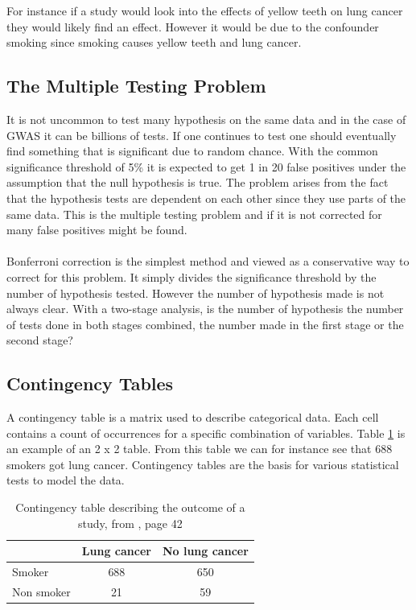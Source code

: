 \documentclass[10pt,a4paper]{report}
\newcounter{example}
\begin{document}
For instance if a study would look into the effects of yellow teeth on lung cancer they would likely find an effect. However it would be due to the confounder smoking since smoking causes yellow teeth and lung cancer. %

\subsection{The Multiple Testing Problem}
It is not uncommon to test many hypothesis on the same data and in the case of GWAS it can be billions of tests. If one continues to test one should eventually find something that is significant due to random chance. With the common significance threshold of 5\% it is expected to get 1 in 20 false positives under the assumption that the null hypothesis is true. The problem arises from the fact that the hypothesis tests are dependent on each other since they use parts of the same data. This is the multiple testing problem and if it is not corrected for many false positives might be found.\cite{bonferroni_multiple}\\
\\
Bonferroni correction is the simplest method and viewed as a conservative way to correct for this problem. It simply divides the significance threshold by the number of hypothesis tested. However the number of hypothesis made is not always clear. With a two-stage analysis, is the number of hypothesis the number of tests done in both stages combined, the number made in the first stage or the second stage?\cite{bonferroni_multiple}

\newpage
\subsection{Contingency Tables}
A contingency table is a matrix used to describe categorical data. Each cell contains a count of occurrences for a specific combination of variables. Table \ref{table:contingency_table} is an example of an 2 x 2 table. From this table we can for instance see that 688 smokers got lung cancer. Contingency tables are the basis for various statistical tests to model the data.\cite{agresti_categorical}

\begin{table}[h]
\begin{tabular}{| l c c |}
  \hline
  & Lung cancer & No lung cancer\\
  \hline
  Smoker & 688 & 650 \\
  Non smoker & 21 & 59 \\
  \hline  
\end{tabular}
\caption{Contingency table describing the outcome of a study, from \cite{agresti_categorical}, page 42}
\label{table:contingency_table}
\end{table}
\end{document}
